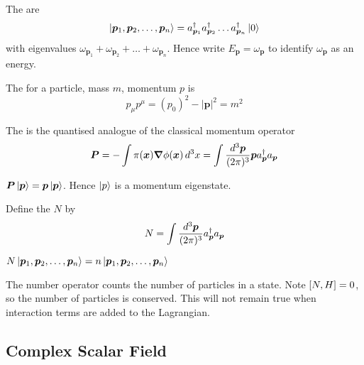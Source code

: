 \documentclass{article}
\begin{document}
\begin{definition}
The  are 
\[
\ket{\bm{p}_1,\bm{p}_2,\dots,\bm{p}_n}=a_{\bm{p}_1}^\dagger a_{\bm{p}_2}^\dagger \dots a_{\bm{p}_n}^\dagger \ket{0}
\]
with eigenvalues $\omega_{\bm{p}_1}+\omega_{\bm{p}_2}+\dots+\omega_{\bm{p}_n}$. Hence write $E_{\bm{p}}=\omega_{\bm{p}}$ to identify $\omega_{\bm{p}}$ as an energy.
\end{definition}

\begin{definition}
The  for a particle, mass $m$, momentum $p$ is 
\[
p_\mu p^\mu = (p_0)^2-|\bm{p}|^2=m^2
\]
\end{definition}

\begin{definition}
The  is the quantised analogue of the classical momentum operator 
\[
\bm{P}=-\int \pi(\bm{x}) \grad\phi(\bm{x}) \, d^3x = \int \tmeas \bm{p} a_{\bm{p}}^\dagger a_{\bm{p}}
\]
\end{definition}

\begin{theorem}
$\bm{P}\ket{\bm{p}}=\bm{p}\ket{\bm{p}}$. Hence $\ket{p}$ is a momentum eigenstate. 
\end{theorem}

\begin{definition}
Define the  $N$ by 
\[
N=\int \tmeas a_{\bm{p}}^\dagger a_{\bm{p}}
\]
\end{definition}

\begin{theorem}
$N\ket{\bm{p}_1,\bm{p}_2,\dots,\bm{p}_n}=n\ket{\bm{p}_1,\bm{p}_2,\dots,\bm{p}_n}$
\end{theorem}

\begin{idea}
The number operator counts the number of particles in a state. Note $\comm[N]{H}=0$, so the number of particles is conserved. This will not remain true when interaction terms are added to the Lagrangian. 
\end{idea}

\subsection{Complex Scalar Field}
\end{document}
